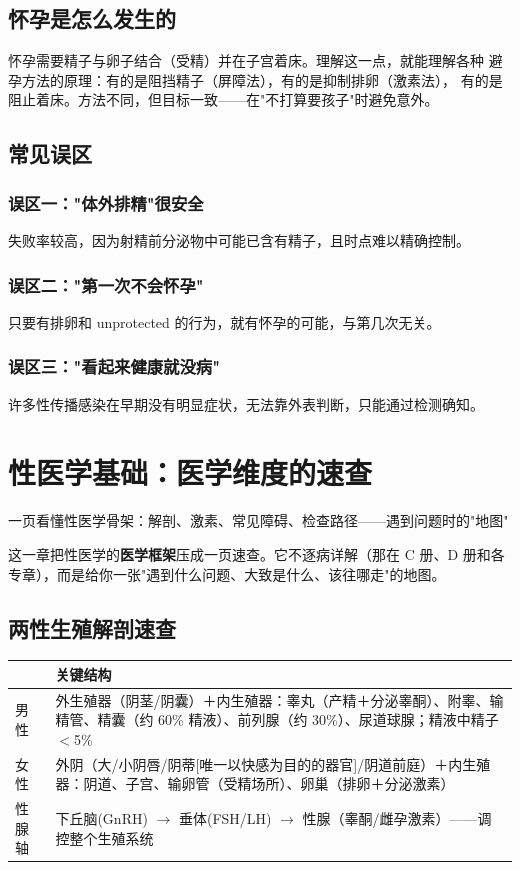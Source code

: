 \documentclass[12pt,UTF8,openany]{ctexbook}
\begin{document}
\section{怀孕是怎么发生的}

怀孕需要精子与卵子结合（受精）并在子宫着床。理解这一点，就能理解各种
避孕方法的原理：有的是阻挡精子（屏障法），有的是抑制排卵（激素法），
有的是阻止着床。方法不同，但目标一致——在"不打算要孩子"时避免意外。

\section{常见误区}

\subsection*{误区一："体外排精"很安全}
失败率较高，因为射精前分泌物中可能已含有精子，且时点难以精确控制。

\subsection*{误区二："第一次不会怀孕"}
只要有排卵和 unprotected 的行为，就有怀孕的可能，与第几次无关。

\subsection*{误区三："看起来健康就没病"}
许多性传播感染在早期没有明显症状，无法靠外表判断，只能通过检测确知。

\chapter{性医学基础：医学维度的速查}
\label{chap:medbase}

\begin{center}
\myhei\large 一页看懂性医学骨架：解剖、激素、常见障碍、检查路径——遇到问题时的"地图"
\end{center}

这一章把性医学的\textbf{医学框架}压成一页速查。它不逐病详解（那在 C 册、D 册和各专章），而是给你一张"遇到什么问题、大致是什么、该往哪走"的地图。

\section{两性生殖解剖速查}

\begin{tabularx}{\textwidth}{p{2.2cm}X}
\toprule
& 关键结构 \\
\midrule
男性 & 外生殖器（阴茎/阴囊）＋内生殖器：睾丸（产精＋分泌睾酮）、附睾、输精管、精囊（约 60\% 精液）、前列腺（约 30\%）、尿道球腺；精液中精子 $<$5\% \\
女性 & 外阴（大/小阴唇/阴蒂[唯一以快感为目的的器官]/阴道前庭）＋内生殖器：阴道、子宫、输卵管（受精场所）、卵巢（排卵＋分泌激素） \\
性腺轴 & 下丘脑(GnRH) $\to$ 垂体(FSH/LH) $\to$ 性腺（睾酮/雌孕激素）——调控整个生殖系统 \\
\bottomrule
\end{tabularx}
\end{document}
